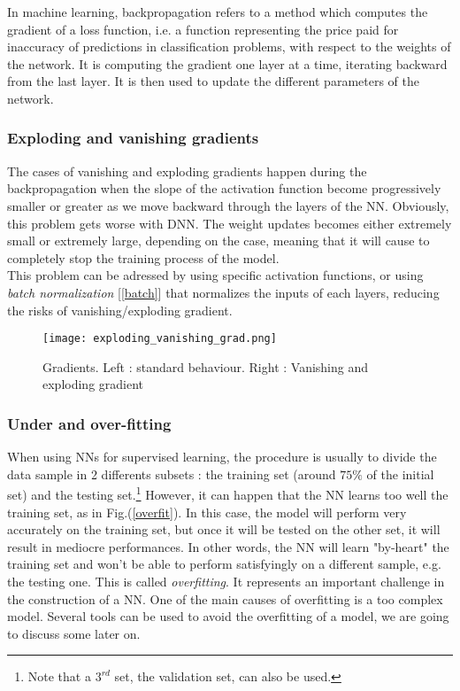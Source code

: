\documentclass [12pt] {article}
\numberwithin{equation}{section} %
\numberwithin{figure}{section}   %
\begin{document}
In machine learning, backpropagation refers to a method which computes the gradient of a loss function, i.e. a function representing the price paid for inaccuracy of predictions in classification problems, with respect to the weights of the network. It is computing the gradient one layer at a time, iterating backward from the last layer. It is then used to update the different parameters of the network.

\subsubsection*{Exploding and vanishing gradients}

The cases of vanishing and exploding gradients happen during the backpropagation when the slope of the activation function become progressively smaller or greater as we move backward through the layers of the NN. Obviously, this problem gets worse with DNN. The weight updates becomes either extremely small or extremely large, depending on the case, meaning that it will cause to completely stop the training process of the model.\\
This problem can be adressed by using specific activation functions, or using \textit{batch normalization} [\ref{batch}] that normalizes the inputs of each layers, reducing the risks of vanishing/exploding gradient.

\begin{figure}[H]
    \centering
    \texttt{[image: exploding\_vanishing\_grad.png]}
    \caption{Gradients. Left : standard behaviour. Right : Vanishing and exploding gradient}
    \label{fig:enter-label}
\end{figure}

\subsubsection*{Under and over-fitting}

When using NNs for supervised learning, the procedure is usually to divide the data sample in 2 differents subsets : the training set (around $75\%$ of the initial set) and the testing set.\footnote{Note that a $3^{rd}$ set, the validation set, can also be used.} However, it can happen that the NN learns too well the training set, as in Fig.(\ref{overfit}). In this case, the model will perform very accurately on the training set, but once it will be tested on the other set, it will result in mediocre performances. In other words, the NN will learn "by-heart" the training set and won't be able to perform satisfyingly on a different sample, e.g. the testing one. This is called \textit{overfitting}. It represents an important challenge in the construction of a NN. One of the main causes of overfitting is a too complex model. Several tools can be used to avoid the overfitting of a model, we are going to discuss some later on.\\
\end{document}
